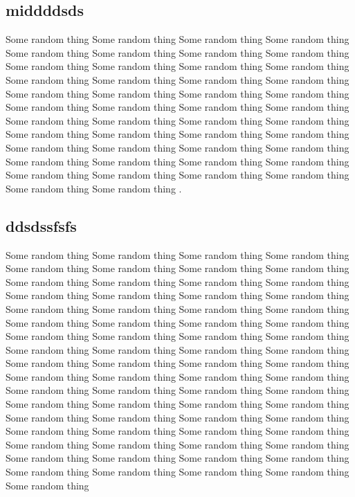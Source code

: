 \subsection{middddsds}  Some random thing Some random thing Some random thing Some random thing Some random thing Some random thing Some random thing Some random thing Some random thing Some random thing Some random thing Some random thing Some random thing Some random thing Some random thing Some random thing Some random thing Some random thing Some random thing Some random thing Some random thing Some random thing Some random thing  
Some random thing Some random thing Some random thing Some random thing Some random thing Some random thing Some random thing Some random thing Some random thing Some random thing Some random thing Some random thing Some random thing Some random thing Some random thing Some random thing Some random thing Some random thing Some random thing Some random thing Some random thing Some random thing Some random thing  .\newline 

\subsection{ddsdssfsfs}
Some random thing Some random thing Some random thing Some random thing Some random thing Some random thing Some random thing Some random thing Some random thing Some random thing Some random thing Some random thing Some random thing Some random thing Some random thing Some random thing Some random thing Some random thing Some random thing Some random thing Some random thing Some random thing Some random thing  \cite{fusion_analytics} Some random thing Some random thing Some random thing Some random thing Some random thing Some random thing Some random thing Some random thing Some random thing Some random thing Some random thing Some random thing Some random thing Some random thing Some random thing Some random thing Some random thing Some random thing Some random thing Some random thing Some random thing Some random thing Some random thing   \cite{mslinks2} Some random thing Some random thing Some random thing Some random thing Some random thing Some random thing Some random thing Some random thing Some random thing Some random thing Some random thing Some random thing Some random thing Some random thing Some random thing Some random thing Some random thing Some random thing Some random thing Some random thing Some random thing Some random thing Some random thing  
